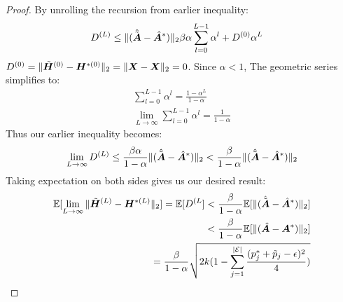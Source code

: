 \begin{proof}
By unrolling the recursion from earlier inequality:
\begin{align*}
     D^{(L)} &\leq \| (\hat{{\tilde{{\bm{A}}}}} -\hat{{\bm{A}}}^*) \|_{2} \beta \alpha\sum_{l=0}^{L-1} \alpha^{l} + D^{(0)}\alpha^L
\end{align*}
$D^{(0)} = \| {\tilde{{\bm{H}}}}^{(0)} - {\bm{H}}^{*(0)} \|_{2} = \| {\bm{X}} - {\bm{X}} \|_{2} = 0$. Since $\alpha < 1$, The geometric series simplifies to:
\begin{align*}
\sum_{l=0}^{L-1} \alpha^{l} = \frac{1-\alpha^L}{1-\alpha} \\
\lim_{L \to \infty} \sum_{l=0}^{L-1} \alpha^{l} = \frac{1}{1-\alpha}
\end{align*}
Thus our earlier inequality becomes:
\[
\lim_{L \to \infty} D^{(L)} \leq \frac{\beta\alpha}{1-\alpha}\| (\hat{{\tilde{{\bm{A}}}}} -\hat{{\bm{A}}}^*) \|_{2} < \frac{\beta}{1-\alpha}\| (\hat{{\tilde{{\bm{A}}}}} -\hat{{\bm{A}}}^*) \|_{2}
\]
Taking expectation on both sides gives us our desired result:
\small{
\begin{align*}
    \mathbb{E}[\lim_{L \to \infty} \| {\tilde{{\bm{H}}}}^{(L)} - {\bm{H}}^{*(L)} \|_{2}] = \mathbb{E}[D^{(L}] < \frac{\beta}{1-\alpha}\mathbb{E}[\| (\hat{{\tilde{{\bm{A}}}}} -\hat{{\bm{A}}}^*) \|_{2}] \\
    < \frac{\beta}{1-\alpha}\mathbb{E}[\| (\hat{{\bm{A}}} - {\bm{A}}^*) \|_{2}] \\
    = \frac{\beta}{1-\alpha}\sqrt{2k (1 - \sum_{j=1}^{|\mathcal{E}|} \frac{(p^*_j + \tilde{p}_j - \epsilon)^2}{4})}
\end{align*}
}
\end{proof}
    

